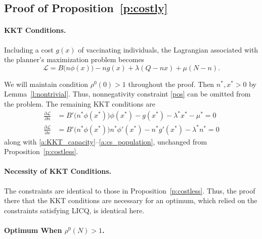 \documentclass[12pt]{article}
\newcommand{\efficacy}{\phi}
\newcommand{\general}{g}
\newcommand{\benefit}{B}
\newcommand{\ratio}{\rho^0\!}
\newcommand{\Lagrangian}{\mathscr{L}}
\begin{document}

\subsection*{Proof of Proposition~\ref{p:costly}}

\paragraph{KKT Conditions.}

Including a cost $\general(x)$ of vaccinating individuals, the
Lagrangian associated with the planner's maximization problem becomes
\begin{equation}
\label{a:Lagrangian_costly}
\Lagrangian = \benefit \bigl( n \efficacy(x) \bigr) - n\general(x) +
\lambda(Q - nx) + \mu(N - n).
\end{equation}

We will maintain condition $\ratio(0) > 1$ throughout the proof. Then
$n^*, x^* > 0$ by Lemma~\ref{l:nontrivial}.  Thus,
nonnegativity constraint \eqref{pos} can be omitted from the
problem. The remaining KKT conditions are
\begin{align}
\frac{\partial \Lagrangian}{\partial n} & = \benefit' \! \bigl( n^* \efficacy(x^*) \bigr) \efficacy(x^*) - \general(x^*) - \lambda^* x^* - \mu^* = 0 \label{a:partial_L_partial_n_costly} \\
\frac{\partial \Lagrangian}{\partial x} & = \benefit' \! \bigl( n^* \efficacy(x^*) \bigr) n^* \efficacy'(x^*) - n^* \general'(x^*) - \lambda^* n^* = 0 \label{a:partial_L_partial_x_costly} 
\end{align}
along with \eqref{a:KKT_capacity}--\eqref{a:cs_population}, unchanged
from Proposition~\ref{p:costless}.

\paragraph{Necessity of KKT Conditions.}

The constraints are identical to those in
Proposition~\ref{p:costless}. Thus, the proof there that the KKT
conditions are necessary for an optimum, which relied on the
constraints satisfying LICQ, is identical here.

\paragraph{Optimum When $\ratio(N) > 1$.}
\end{document}
